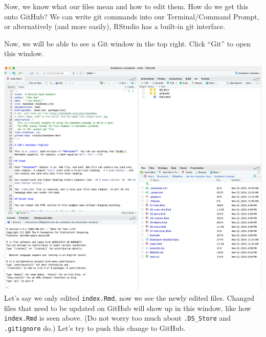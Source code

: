 \documentclass[
]{book}
\theoremstyle{definition}
\theoremstyle{definition}
\theoremstyle{definition}
\theoremstyle{definition}
\theoremstyle{remark}
\begin{document}
Now, we know what our files mean and how to edit them. How do we get this onto GitHub? We can write git commands into our Terminal/Command Prompt, or alternatively (and more easily), RStudio has a built-in git interface.

Now, we will be able to see a Git window in the top right. Click ``Git'' to open this window.

\includegraphics{img/git-instruct/RStudio-with-git-window-open.png}\\

Let's say we only edited \texttt{index.Rmd}, now we see the newly edited files. Changed files that need to be updated on GitHub will show up in this window, like how \texttt{index.Rmd} is seen above. (Do not worry too much about \texttt{.DS\_Store} and \texttt{.gitignore} do.) Let's try to push this change to GitHub.
\end{document}
